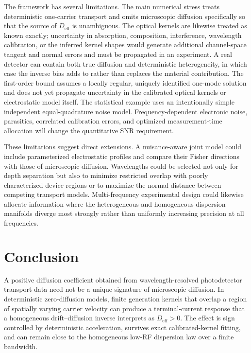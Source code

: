 \documentclass[aps,pra,twocolumn,superscriptaddress,nofootinbib]{revtex4-2}
\newcommand{\Deff}{D_{\mathrm{eff}}}
\begin{document}
The framework has several limitations. The main numerical stress treats deterministic one-carrier transport and omits microscopic diffusion specifically so that the source of $\Deff$ is unambiguous.  The optical kernels are likewise treated as known exactly; uncertainty in absorption, composition, interference, wavelength calibration, or the inferred kernel shapes would generate additional channel-space tangent and normal errors and must be propagated in an experiment. A real detector can contain both true diffusion and deterministic heterogeneity, in which case the inverse bias adds to rather than replaces the material contribution. The first-order bound assumes a locally regular, uniquely identified one-mode solution and does not yet propagate uncertainty in the calibrated optical kernels or electrostatic model itself. The statistical example uses an intentionally simple independent equal-quadrature noise model. Frequency-dependent electronic noise, parasitics, correlated calibration errors, and optimized measurement-time allocation will change the quantitative SNR requirement.

These limitations suggest direct extensions. A nuisance-aware joint model could include parameterized electrostatic profiles and compare their Fisher directions with those of microscopic diffusion. Wavelengths could be selected not only for depth separation but also to minimize restricted overlap with poorly characterized device regions or to maximize the normal distance between competing transport models. Multi-frequency experimental design could likewise allocate information where the heterogeneous and homogeneous dispersion manifolds diverge most strongly rather than uniformly increasing precision at all frequencies.

\section{Conclusion}

A positive diffusion coefficient obtained from wavelength-resolved photodetector transport data need not be a unique signature of microscopic diffusion. In deterministic zero-diffusion models, finite generation kernels that overlap a region of spatially varying carrier velocity can produce a terminal-current response that a homogeneous drift--diffusion inverse interprets as $\Deff>0$. The effect is sign controlled by deterministic acceleration, survives exact calibrated-kernel fitting, and can remain close to the homogeneous low-RF dispersion law over a finite bandwidth.
\end{document}
